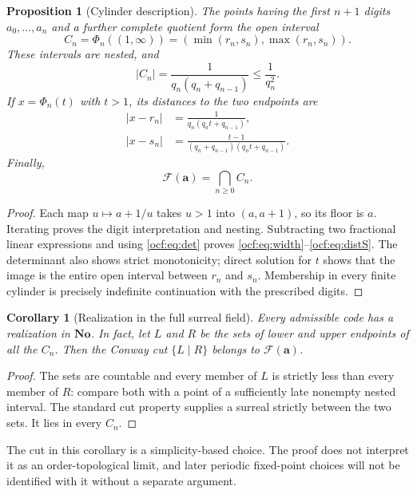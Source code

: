 \documentclass[11pt,a4paper]{article}
\numberwithin{equation}{section}
\newtheorem{proposition}[theorem]{Proposition}
\newtheorem{corollary}[theorem]{Corollary}
\theoremstyle{definition}
\theoremstyle{remark}
\newcommand{\No}{\mathbf{No}}
\newcommand{\F}{\mathcal F}
\newcommand{\codea}{\boldsymbol a}
\begin{document}
\begin{proposition}[Cylinder description]\label{ocf:prop:cylinder}
The points having the first $n+1$ digits $a_0,\ldots,a_n$ and a further
complete quotient form the open interval
\[
 C_n=\Phi_n((1,\infty))
    =(\min(r_n,s_n),\max(r_n,s_n)).
\]
These intervals are nested, and
\begin{equation}\label{ocf:eq:width}
 |C_n|=\frac1{q_n(q_n+q_{n-1})}\le\frac1{q_n^2}.
\end{equation}
If $x=\Phi_n(t)$ with $t>1$, its distances to the two endpoints are
\begin{align}
 |x-r_n|&=\frac1{q_n(q_nt+q_{n-1})},\label{ocf:eq:distR}\\
 |x-s_n|&=\frac{t-1}{(q_n+q_{n-1})(q_nt+q_{n-1})}.\label{ocf:eq:distS}
\end{align}
Finally,
\begin{equation}\label{ocf:eq:intersection}
 \F(\codea)=\bigcap_{n\ge0}C_n.
\end{equation}
\end{proposition}
\begin{proof}
Each map $u\mapsto a+1/u$ takes $u>1$ into $(a,a+1)$, so its floor is
$a$. Iterating proves the digit interpretation and nesting. Subtracting
two fractional linear expressions and using \eqref{ocf:eq:det} proves
\eqref{ocf:eq:width}--\eqref{ocf:eq:distS}. The determinant also shows strict
monotonicity; direct solution for $t$ shows that the image is the entire
open interval between $r_n$ and $s_n$. Membership in every finite cylinder
is precisely indefinite continuation with the prescribed digits.
\end{proof}

\begin{corollary}[Realization in the full surreal field]\label{ocf:cor:realization}
Every admissible code has a realization in $\No$. In fact, let $L$ and $R$
be the sets of lower and upper endpoints of all the $C_n$. Then the Conway
cut $\{L\mid R\}$ belongs to $\F(\codea)$.
\end{corollary}
\begin{proof}
The sets are countable and every member of $L$ is strictly less than every
member of $R$: compare both with a point of a sufficiently late nonempty
nested interval. The standard cut property supplies a surreal strictly
between the two sets. It lies in every $C_n$.
\end{proof}

The cut in this corollary is a simplicity-based choice. The proof does not
interpret it as an order-topological limit, and later periodic fixed-point
choices will not be identified with it without a separate argument.
\end{document}
